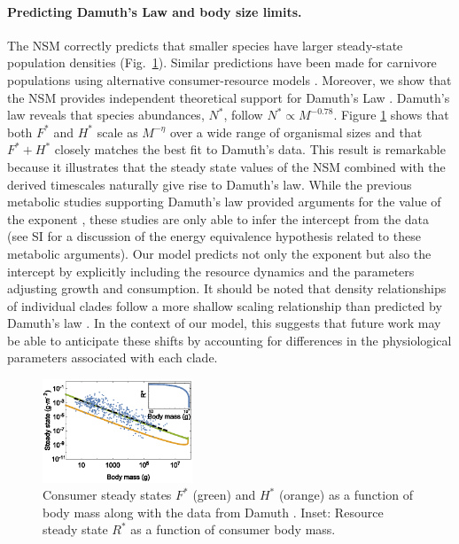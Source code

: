 \documentclass[twocolumn,preprintnumbers,amsmath,amssymb,superscriptaddress]{revtex4}
\begin{document}
\noindent \paragraph*{{\bf Predicting Damuth's Law and body size limits.}} The NSM correctly predicts that smaller species have larger
steady-state population densities (Fig.~\ref{fig:mass}).  Similar
predictions have been made for carnivore populations using alternative
consumer-resource models \citep{DeLong:2012kw}.  Moreover, we show that the
NSM provides independent theoretical support for Damuth's Law \citep{Damuth:1987kr,allen2002,enquist1998,pedersen2017shallow}. 
Damuth's law reveals that species abundances, $N^{*}$, follow $N^*\propto M^{-0.78}$. Figure \ref{fig:mass} shows
that both $F^{*}$ and $H^{*}$ scale as $M^{-\eta}$ over a wide range of
organismal sizes and that $F^{*}+H^{*}$ closely matches the best fit to Damuth's data. This result is remarkable because it
illustrates that the steady state values of the NSM combined with the derived
timescales naturally give rise to Damuth's law. While the previous metabolic studies supporting Damuth's law provided arguments for the value of the exponent \citep{allen2002}, these studies are only able to infer the intercept from the data (see SI for a discussion of the energy equivalence hypothesis related to these metabolic arguments). Our model predicts not only the exponent but also the intercept by explicitly including the resource dynamics and the parameters adjusting growth and consumption. It should be noted that density relationships of individual clades follow a more shallow scaling relationship than predicted by Damuth's law \cite{pedersen2017shallow}. In the context of our model, this suggests that future work may be able to anticipate these shifts by accounting for differences in the physiological parameters associated with each clade.


\begin{figure}
\centering
\includegraphics[width=0.4\textwidth]{fig_FPAllometric2.eps}
\caption{\small{Consumer steady states $F^*$ (green) and $H^*$ (orange) as a function of
  body mass along with the data from Damuth \citep{Damuth:1987kr}. Inset: Resource steady state $R^*$ as a function of consumer body mass.}\label{fig:mass}}
\end{figure}
\end{document}
